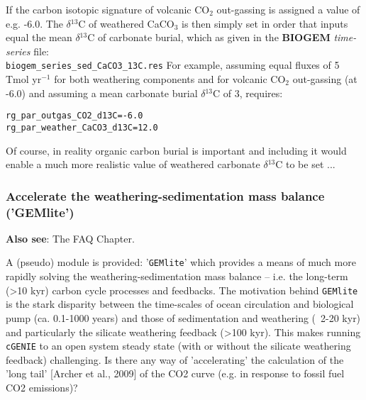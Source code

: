 \documentclass[11pt,fleqn]{book} %
\begin{document}
If the carbon isotopic signature of volcanic CO$_{2}$ out-gassing is assigned a value of e.g. -6.0\textperthousand. The $\delta$$^{13}$C of weathered CaCO$_{3}$ is then simply set in order that inputs equal the mean $\delta$$^{13}$C of carbonate burial, which as given in the \textbf{BIOGEM} \textit{time-series} file:
\\\texttt{biogem\_series\_sed\_CaCO3\_13C.res}
For example, assuming equal fluxes of 5 Tmol yr$^{-1}$ for both weathering components and for volcanic CO$_{2}$ out-gassing (at -6.0\textperthousand) and assuming a mean carbonate burial $\delta$$^{13}$C of 3\textperthousand, requires:
\vspace{-1mm}\begin{verbatim}
rg_par_outgas_CO2_d13C=-6.0
rg_par_weather_CaCO3_d13C=12.0
\end{verbatim}\vspace{-1mm}
Of course, in reality organic carbon burial is important and including it would enable a much more realistic value of weathered carbonate $\delta$$^{13}$C to be set ...

%
\newpage
\subsubsection{Accelerate the weathering-sedimentation mass balance ('GEMlite')}\label{GEMlite}

\noindent \textbf{Also see}: The FAQ Chapter.

\noindent A (pseudo) module is provided: '\texttt{GEMlite}' which provides a means of much more rapidly solving the weathering-sedimentation mass balance -- i.e. the long-term (>10 kyr) carbon cycle processes and feedbacks. The motivation behind \texttt{GEMlite} is the stark disparity between the time-scales of ocean circulation and biological pump (ca. 0.1-1000 years) and those of sedimentation and weathering (~2-20 kyr) and particularly the silicate weathering feedback (>100 kyr). This makes running \texttt{cGENIE} to an open system steady state (with or without the silicate weathering feedback) challenging. Is there any way of 'accelerating' the calculation of the 'long tail' [Archer et al., 2009] of the CO2 curve (e.g. in response to fossil fuel CO2 emissions)?
\end{document}
